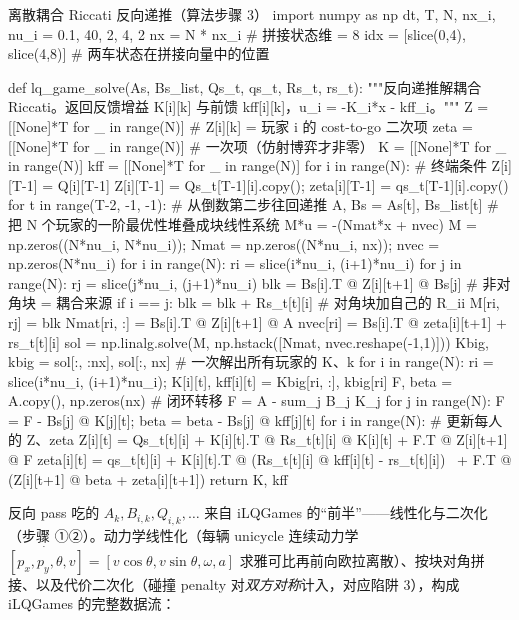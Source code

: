 \begin{codebox}[Python]{离散耦合 Riccati 反向递推（算法步骤 3）}
import numpy as np
dt, T, N, nx_i, nu_i = 0.1, 40, 2, 4, 2
nx = N * nx_i                                  # 拼接状态维 = 8
idx = [slice(0,4), slice(4,8)]                 # 两车状态在拼接向量中的位置

def lq_game_solve(As, Bs_list, Qs_t, qs_t, Rs_t, rs_t):
    """反向递推解耦合 Riccati。返回反馈增益 K[i][k] 与前馈 kff[i][k]，u_i = -K_i*x - kff_i。"""
    Z    = [[None]*T for _ in range(N)]        # Z[i][k] = 玩家 i 的 cost-to-go 二次项
    zeta = [[None]*T for _ in range(N)]        # 一次项（仿射博弈才非零）
    K    = [[None]*T for _ in range(N)]
    kff  = [[None]*T for _ in range(N)]
    for i in range(N):                          # 终端条件 Z[i][T-1] = Q[i][T-1]
        Z[i][T-1] = Qs_t[T-1][i].copy(); zeta[i][T-1] = qs_t[T-1][i].copy()
    for t in range(T-2, -1, -1):                # 从倒数第二步往回递推
        A, Bs = As[t], Bs_list[t]
        # 把 N 个玩家的一阶最优性堆叠成块线性系统 M*u = -(Nmat*x + nvec)
        M    = np.zeros((N*nu_i, N*nu_i)); Nmat = np.zeros((N*nu_i, nx)); nvec = np.zeros(N*nu_i)
        for i in range(N):
            ri = slice(i*nu_i, (i+1)*nu_i)
            for j in range(N):
                rj  = slice(j*nu_i, (j+1)*nu_i)
                blk = Bs[i].T @ Z[i][t+1] @ Bs[j]      # 非对角块 = 耦合来源
                if i == j: blk = blk + Rs_t[t][i]      # 对角块加自己的 R_ii
                M[ri, rj] = blk
            Nmat[ri, :] = Bs[i].T @ Z[i][t+1] @ A
            nvec[ri]    = Bs[i].T @ zeta[i][t+1] + rs_t[t][i]
        sol  = np.linalg.solve(M, np.hstack([Nmat, nvec.reshape(-1,1)]))
        Kbig, kbig = sol[:, :nx], sol[:, nx]            # 一次解出所有玩家的 K、k
        for i in range(N):
            ri = slice(i*nu_i, (i+1)*nu_i); K[i][t], kff[i][t] = Kbig[ri, :], kbig[ri]
        F, beta = A.copy(), np.zeros(nx)                # 闭环转移 F = A - sum_j B_j K_j
        for j in range(N):
            F = F - Bs[j] @ K[j][t]; beta = beta - Bs[j] @ kff[j][t]
        for i in range(N):                              # 更新每人的 Z、zeta
            Z[i][t]    = Qs_t[t][i] + K[i][t].T @ Rs_t[t][i] @ K[i][t] + F.T @ Z[i][t+1] @ F
            zeta[i][t] = qs_t[t][i] + K[i][t].T @ (Rs_t[t][i] @ kff[i][t] - rs_t[t][i]) \
                         + F.T @ (Z[i][t+1] @ beta + zeta[i][t+1])
    return K, kff
\end{codebox}

\noindent 反向 pass 吃的 $A_k,B_{i,k},Q_{i,k},\dots$ 来自 iLQGames 的“前半”——线性化与二次化（步骤 ①②）。动力学线性化（每辆 unicycle 连续动力学 $\dot{[p_x,p_y,\theta,v]}=[v\cos\theta,v\sin\theta,\omega,a]$ 求雅可比再前向欧拉离散）、按块对角拼接、以及代价二次化（碰撞 penalty 对\emph{双方对称}计入，对应陷阱 3），构成 iLQGames 的完整数据流：

